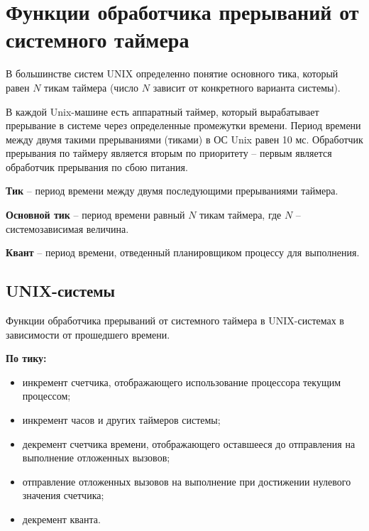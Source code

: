 \chapter{Функции обработчика прерываний от системного таймера}

В большинстве систем UNIX определенно понятие основного тика, который равен $N$ тикам таймера (число $N$ зависит от конкретного варианта системы).

В каждой {\ttfamily Unix}-машине есть аппаратный таймер, который вырабатывает прерывание в системе через определенные промежутки времени. Период времени между двумя такими прерываниями (тиками) в ОС {\ttfamily Unix} равен 10 мс. Обработчик прерывания по таймеру является вторым по приоритету – первым является обработчик прерывания по сбою питания.

\textbf{Тик} -- период времени между двумя последующими прерываниями таймера.

\textbf{Основной тик} -- период времени равный $N$ тикам таймера, где $N$ -- системозависимая величина.

\textbf{Квант} -- период времени, отведенный планировщиком процессу для выполнения.

\section{UNIX-системы}

Функции обработчика прерываний от системного таймера в UNIX-системах в зависимости от прошедшего времени.

\textbf{По тику:}
\begin{itemize}
	\item инкремент счетчика, отображающего использование процессора текущим процессом;
	\item инкремент часов и других таймеров системы;
	\item декремент счетчика времени, отображающего оставшееся до отправления на выполнение отложенных вызовов;
	\item отправление отложенных вызовов на выполнение при достижении нулевого значения счетчика;
	\item декремент кванта.
\end{itemize}

